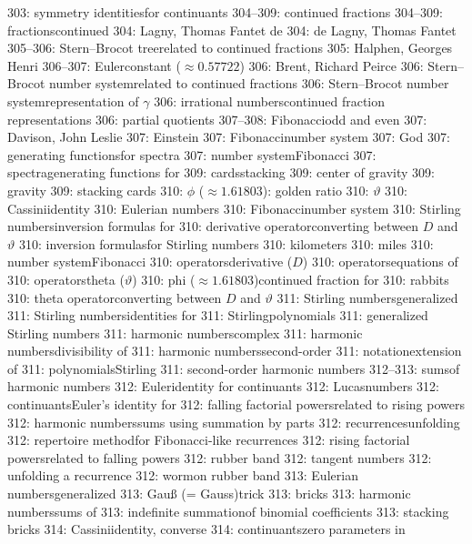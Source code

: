 303: symmetry identities\sub for continuants
304--309: continued fractions
304--309: fractions\sub continued
304: Lagny, Thomas Fantet de
304: de Lagny, Thomas Fantet
305--306: Stern--Brocot tree\sub related to continued fractions
305: Halphen, Georges Henri
306--307: Euler\sub constant ($\approx0.57722$)
306: Brent, Richard Peirce
306: Stern--Brocot number system\sub related to continued fractions
306: Stern--Brocot number system\sub representation of $\gamma$
306: irrational numbers\sub continued fraction representations
306: partial quotients
307--308: Fibonacci\sub odd and even
307: Davison, John Leslie
307: Einstein
307: Fibonacci\sub number system
307: God
307: generating functions\sub for spectra
307: number system\sub Fibonacci
307: spectra\sub generating functions for
309: cards\sub stacking
309: center of gravity
309: gravity
309: stacking cards
310: $\phi$ ($\approx1.61803$): golden ratio
310: $\vartheta$
310: Cassini\sub identity
310: Eulerian numbers
310: Fibonacci\sub number system
310: Stirling numbers\sub inversion formulas for
310: derivative operator\sub converting between $D$ and $\vartheta$
310: inversion formulas\sub for Stirling numbers
310: kilometers
310: miles
310: number system\sub Fibonacci
310: operators\sub derivative ($D$)
310: operators\sub equations of
310: operators\sub theta ($\vartheta$)
310: phi ($\approx1.61803$)\sub continued fraction for
310: rabbits
310: theta operator\sub converting between $D$ and $\vartheta$
311: Stirling numbers\sub generalized
311: Stirling numbers\sub identities for
311: Stirling\sub polynomials
311: generalized Stirling numbers
311: harmonic numbers\sub complex
311: harmonic numbers\sub divisibility of
311: harmonic numbers\sub second-order
311: notation\sub extension of
311: polynomials\sub Stirling
311: second-order harmonic numbers
312--313: sums\sub of harmonic numbers
312: Euler\sub identity for continuants
312: Lucas\sub numbers
312: continuants\sub Euler's identity for
312: falling factorial powers\sub related to rising powers
312: harmonic numbers\sub sums using summation by parts
312: recurrences\sub unfolding
312: repertoire method\sub for Fibonacci-like recurrences
312: rising factorial powers\sub related to falling powers
312: rubber band
312: tangent numbers
312: unfolding a recurrence
312: worm\sub on rubber band
313: Eulerian numbers\sub generalized
313: Gau{\ss} (= Gauss)\sub trick
313: bricks
313: harmonic numbers\sub sums of
313: indefinite summation\sub of binomial coefficients
313: stacking bricks
314: Cassini\sub identity, converse
314: continuants\sub zero parameters in
